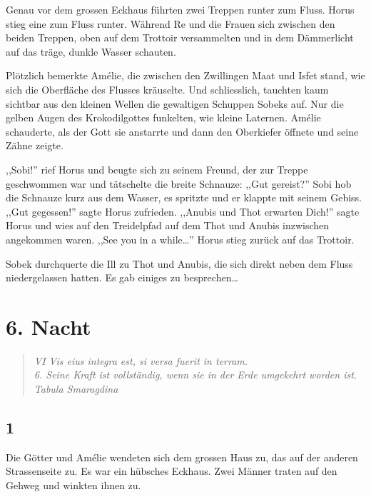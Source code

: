 Genau vor dem grossen Eckhaus führten zwei Treppen runter zum Fluss. Horus stieg eine zum Fluss runter. Während Re und die Frauen sich zwischen den beiden Treppen, oben auf dem Trottoir versammelten und in dem Dämmerlicht auf das träge, dunkle Wasser schauten.

Plötzlich bemerkte Amélie, die zwischen den Zwillingen Maat und Isfet stand, wie sich die Oberfläche des Flusses kräuselte. Und schliesslich, tauchten kaum sichtbar aus den kleinen Wellen die gewaltigen Schuppen Sobeks auf. Nur die gelben Augen des Krokodilgottes funkelten, wie kleine Laternen. Amélie schauderte, als der Gott sie anstarrte und dann den Oberkiefer öffnete und seine Zähne zeigte.

,,Sobi!'' rief Horus und beugte sich zu seinem Freund, der zur Treppe geschwommen war und tätschelte die breite Schnauze: ,,Gut gereist?'' Sobi hob die Schnauze kurz aus dem Wasser, es spritzte und er klappte mit seinem Gebiss. ,,Gut gegessen!'' sagte Horus zufrieden. ,,Anubis und Thot erwarten Dich!'' sagte Horus und wies auf den Treidelpfad auf dem Thot und Anubis inzwischen angekommen waren. ,,See you in a while\dots '' Horus stieg zurück auf das Trottoir.

Sobek durchquerte die Ill zu Thot und Anubis, die sich direkt neben dem Fluss niedergelassen hatten. Es gab einiges zu besprechen\dots

\chapter*{6. Nacht}

\begin{quotation}

\emph{VI Vis eius integra est, si versa fuerit in terram.\\6. Seine Kraft ist vollständig, wenn sie in der Erde umgekehrt worden ist.  \\Tabula Smaragdina}

\end{quotation}

\section*{1}

Die Götter und Amélie wendeten sich dem grossen Haus zu, das auf der anderen Strassenseite zu. Es war ein hübsches Eckhaus. Zwei Männer traten auf den Gehweg und winkten ihnen zu.

